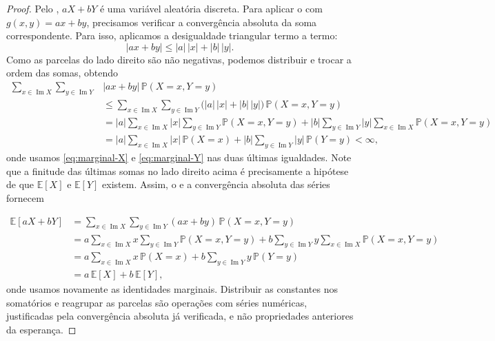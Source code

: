 \documentclass[12pt,portuguese]{article}
\theoremstyle{definition}
\begin{document}
\begin{proof}
Pelo , $aX+bY$ é uma variável aleatória
discreta. Para aplicar o  com $g(x,y)=ax+by$,
precisamos verificar a convergência absoluta da soma correspondente. Para
isso, aplicamos a desigualdade triangular termo a termo:
\[
  |ax+by|\leqslant |a|\,|x|+|b|\,|y|.
\]
Como as parcelas do lado direito são não negativas, podemos distribuir e
trocar a ordem das somas, obtendo
\begin{align*}
\sum_{x\in\operatorname{Im}X}
\sum_{y\in\operatorname{Im}Y}
&|ax+by|\,\mathbb{P}(X=x,Y=y)
\\[0.3cm]
&\leqslant
\sum_{x\in\operatorname{Im}X}
\sum_{y\in\operatorname{Im}Y}
\bigl(|a|\,|x|+|b|\,|y|\bigr)\,
\mathbb{P}(X=x,Y=y)
\\[0.3cm]
&=
|a|\sum_{x\in\operatorname{Im}X}|x|
\sum_{y\in\operatorname{Im}Y}\mathbb{P}(X=x,Y=y)
+
|b|\sum_{y\in\operatorname{Im}Y}|y|
\sum_{x\in\operatorname{Im}X}\mathbb{P}(X=x,Y=y)
\\[0.3cm]
&=
|a|\sum_{x\in\operatorname{Im}X}|x|\,\mathbb{P}(X=x)
+
|b|\sum_{y\in\operatorname{Im}Y}|y|\,\mathbb{P}(Y=y)
<\infty,
\end{align*}
onde usamos \eqref{eq:marginal-X} e \eqref{eq:marginal-Y} nas duas últimas
igualdades. Note que a finitude das últimas somas no lado direito acima 
é precisamente a hipótese de que
$\mathbb{E}[X]$ e $\mathbb{E}[Y]$ existem. Assim, o
 e a convergência absoluta das séries fornecem


\begin{align*}
\mathbb{E}[aX+bY]
&=
\sum_{x\in\operatorname{Im}X}
\sum_{y\in\operatorname{Im}Y}
(ax+by)\,\mathbb{P}(X=x,Y=y)
\\[0.3cm]
&=
a\sum_{x\in\operatorname{Im}X}x
\sum_{y\in\operatorname{Im}Y}\mathbb{P}(X=x,Y=y)
+
b\sum_{y\in\operatorname{Im}Y}y
\sum_{x\in\operatorname{Im}X}\mathbb{P}(X=x,Y=y)
\\[0.3cm]
&=
a\sum_{x\in\operatorname{Im}X}x\,\mathbb{P}(X=x)
+b\sum_{y\in\operatorname{Im}Y}y\,\mathbb{P}(Y=y)
\\[0.3cm]
&=
a\,\mathbb{E}[X]+b\,\mathbb{E}[Y],
\end{align*}
onde usamos novamente as identidades marginais. Distribuir as constantes nos
somatórios e reagrupar as parcelas são operações com séries numéricas,
justificadas pela convergência absoluta já verificada, e não propriedades
anteriores da esperança.
\end{proof}
\end{document}
